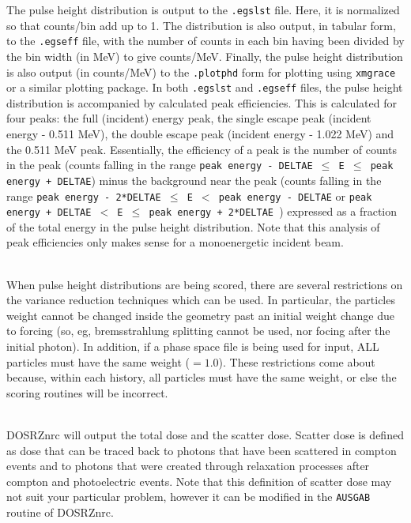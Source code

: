 \documentclass[12pt,twoside]{article}  %
\begin{document}
The pulse height distribution is output to the {\tt .egslst} file.  Here,
it is normalized so that counts/bin add up to 1.  
The distribution is also output, in tabular form, to the {\tt .egseff} file,
with the number of counts in each bin having been divided by the bin
width (in MeV) to give counts/MeV.  Finally, the pulse height distribution is 
also output (in counts/MeV) to the {\tt .plotphd} form for plotting using
{\tt xmgrace} or a similar plotting package.  In both {\tt .egslst} and
{\tt .egseff} files, the pulse height distribution is accompanied by 
calculated peak efficiencies.  This is calculated for four peaks:
the full (incident) energy peak, the single escape peak (incident energy - 0.511 MeV), the double escape peak (incident energy - 1.022 MeV) and the
0.511 MeV peak.  Essentially, the efficiency of a peak is the number of
counts in the peak (counts falling in the range 
{\tt peak energy - DELTAE $\le$ E $\leq$ peak energy + DELTAE}) minus the background
near the peak (counts falling in the range
{\tt peak energy - 2*DELTAE $\le$ E $<$ peak energy - DELTAE} or
{\tt peak energy + DELTAE $<$ E $\leq$ peak energy + 2*DELTAE }) expressed as a
fraction of the total energy in the pulse height distribution.  Note that
this analysis of peak efficiencies only makes sense for a monoenergetic 
incident beam. 
\label{scatsec}

\\
When pulse height distributions are being scored, there are several
restrictions on the variance reduction techniques which can be used. In
particular, the particles weight cannot be changed inside the geometry past
an initial weight change due to forcing (so, eg, bremsstrahlung splitting
cannot be used, nor focing after the initial photon). In addition, if a
phase space file is being used for input, ALL particles must have the same
weight ($= 1.0$). These restrictions come about because, within each
history, all particles must have the same weight, or else the scoring
routines will be incorrect.

\\     DOSRZnrc will output
the total dose and the scatter dose.  Scatter dose is defined as dose
that can be traced back to photons that have been scattered in 
compton events and to photons that were created through relaxation processes
after compton and photoelectric events.  Note that this definition of 
scatter dose may not suit your particular problem, however it can be modified
in the {\tt AUSGAB} routine of DOSRZnrc.
\end{document}

